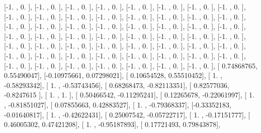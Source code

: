 \documentclass{article}
\begin{document}
       [-1.        ,  0.        ],
       [-1.        ,  0.        ],
       [-1.        ,  0.        ],
       [-1.        ,  0.        ],
       [-1.        ,  0.        ],
       [-1.        ,  0.        ],
       [-1.        ,  0.        ],
       [-1.        ,  0.        ],
       [-1.        ,  0.        ],
       [-1.        ,  0.        ],
       [-1.        ,  0.        ],
       [-1.        ,  0.        ],
       [-1.        ,  0.        ],
       [-1.        ,  0.        ],
       [-1.        ,  0.        ],
       [-1.        ,  0.        ],
       [-1.        ,  0.        ],
       [-1.        ,  0.        ],
       [-1.        ,  0.        ],
       [-1.        ,  0.        ],
       [-1.        ,  0.        ],
       [-1.        ,  0.        ],
       [-1.        ,  0.        ],
       [-1.        ,  0.        ],
       [-1.        ,  0.        ],
       [-1.        ,  0.        ],
       [-1.        ,  0.        ],
       [-1.        ,  0.        ],
       [-1.        ,  0.        ],
       [-1.        ,  0.        ],
       [-1.        ,  0.        ],
       [-1.        ,  0.        ],
       [-1.        ,  0.        ],
       [-1.        ,  0.        ],
       [-1.        ,  0.        ],
       [-1.        ,  0.        ],
       [-1.        ,  0.        ],
       [-1.        ,  0.        ],
       [-1.        ,  0.        ],
       [-1.        ,  0.        ],
       [-1.        ,  0.        ],
       [-1.        ,  0.        ],
       [-1.        ,  0.        ],
       [-1.        ,  0.        ],
       [-1.        ,  0.        ],
       [-1.        ,  0.        ],
       [-1.        ,  0.        ],
       [-1.        ,  0.        ],
       [-1.        ,  0.        ],
       [-1.        ,  0.        ],
       [-1.        ,  0.        ],
       [-1.        ,  0.        ],
       [-1.        ,  0.        ],
       [-1.        ,  0.        ],
       [-1.        ,  0.        ],
       [ 0.74868765,  0.55490047],
       [-0.10975661,  0.07298021],
       [ 0.10654528,  0.55510452],
       [ 1.        , -0.58293342],
       [ 1.        , -0.53743456],
       [ 0.68268473, -0.82113351],
       [ 0.82577036, -0.8247615 ],
       [ 1.        ,  1.        ],
       [ 0.50466542, -0.11295241],
       [ 0.12265678, -0.22061997],
       [ 1.        , -0.81851027],
       [ 0.07855663,  0.42883527],
       [ 1.        , -0.79368337],
       [-0.33352183, -0.01640817],
       [ 1.        , -0.42622431],
       [ 0.25007542, -0.05722717],
       [ 1.        , -0.17151777],
       [ 0.46005302,  0.47421208],
       [ 1.        , -0.95187893],
       [ 0.17721493,  0.79843878],
\end{document}
